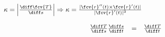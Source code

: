 \begin{frame}
\frametitle {$\kappa  = \left| \frac{\diff\fcv{T}}{\diff s}\right|\Rightarrow \kappa=\frac{|\fcv{r}''(t) \times \fcv{r}'(t)|}{|\fcv{r}'(t)|^3}$}
\[
\begin{array}{rcl}
\frac{\diff T}{\diff s} \frac{\diff s}{\diff t}&=&\frac{\diff T}{\diff t}\\
\end{array}
\]
\end{frame}